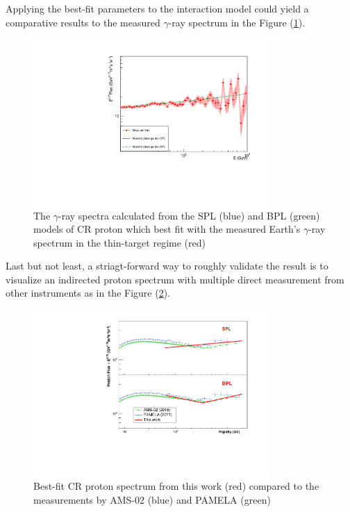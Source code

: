 Applying the best-fit parameters to the interaction model could yield a comparative results
to the measured $\gamma$-ray spectrum in the Figure (\ref{fig:bestfittedgamma}).

\begin{figure}[h!]
    \centering
    \includegraphics[width=0.8\textwidth]{img/ModelVSMeasurement}
    \caption{The $\gamma$-ray spectra calculated from the SPL (blue) and BPL (green) models of CR proton
    which best fit with the measured Earth’s $\gamma$-ray spectrum in the thin-target regime
    (red)}
    \label{fig:bestfittedgamma}
\end{figure}

Last but not least, a striagt-forward way to roughly validate the result is to visualize
an indirected proton spectrum with multiple direct measurement from other instruments as in 
the Figure (\ref{fig:bestfittedproton}).

\begin{figure}[h!]
    \centering
    \includegraphics[width=0.8\textwidth]{img/ProtonSpectrumModelMeasurement}
    \caption{Best-fit CR proton spectrum from this work (red) compared to the measurements
    by AMS-02 (blue) and PAMELA (green)}
    \label{fig:bestfittedproton}
\end{figure}
